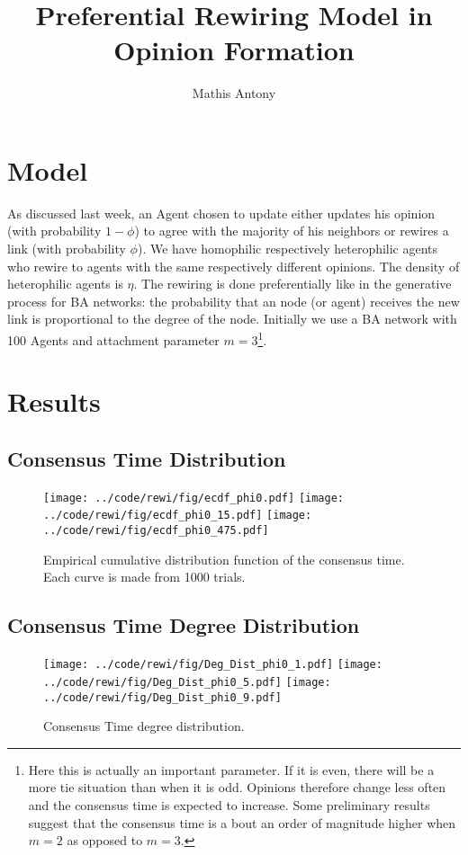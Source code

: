 \documentclass[a4paper,12pt]{scrartcl}
\title{Preferential Rewiring Model in Opinion Formation}
\author{Mathis Antony}
\newcommand{\figwidth}{0.49\linewidth}
\begin{document}
\maketitle
\section{Model}
As discussed last week, an Agent chosen to update either updates his opinion (with probability $1-\phi$) to agree with the majority of his neighbors or rewires a link (with probability $\phi$). We have homophilic respectively heterophilic agents who rewire to agents with the same respectively different opinions. The density of heterophilic agents is $\eta$. The rewiring is done preferentially like in the generative process for BA networks: the probability that an node (or agent) receives the new link is proportional to the degree of the node. Initially we use a BA network with 100 Agents and attachment parameter $m=3$\footnote{Here this is actually an important parameter. If it is even, there will be a more tie situation than when it is odd. Opinions therefore change less often and the consensus time is expected to increase. Some preliminary results suggest that the consensus time is a bout an order of magnitude higher when $m=2$ as opposed to $m=3$.}.

\section{Results}
\subsection{Consensus Time Distribution}
\begin{figure}
\centering
\texttt{[image: ../code/rewi/fig/ecdf\_phi0.pdf]}
\texttt{[image: ../code/rewi/fig/ecdf\_phi0\_15.pdf]}
\texttt{[image: ../code/rewi/fig/ecdf\_phi0\_475.pdf]}
\caption{Empirical cumulative distribution function of the consensus time. Each curve is made from 1000 trials.}
\end{figure}

\subsection{Consensus Time Degree Distribution}
\begin{figure}
\centering
\texttt{[image: ../code/rewi/fig/Deg\_Dist\_phi0\_1.pdf]}
\texttt{[image: ../code/rewi/fig/Deg\_Dist\_phi0\_5.pdf]}
\texttt{[image: ../code/rewi/fig/Deg\_Dist\_phi0\_9.pdf]}
\caption{Consensus Time degree distribution.}
\end{figure}
\end{document}
